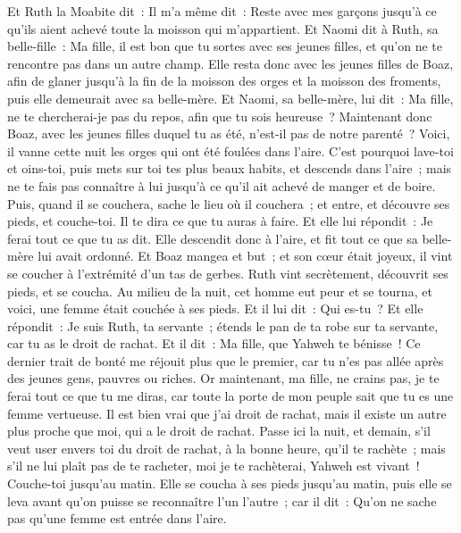\begin{multicols}{2}
Et Ruth la Moabite dit~: Il m'a même dit~: Reste avec mes garçons jusqu'à ce qu'ils aient achevé toute la moisson qui m'appartient.
Et Naomi dit à Ruth, sa belle-fille~: Ma fille, il est bon que tu sortes avec ses jeunes filles, et qu'on ne te rencontre pas dans un autre champ.
Elle resta donc avec les jeunes filles de Boaz, afin de glaner jusqu'à la fin de la moisson des orges et la moisson des froments, puis elle demeurait avec sa belle-mère.
\VerseOne{}Et Naomi, sa belle-mère, lui dit~: Ma fille, ne te chercherai-je pas du repos, afin que tu sois heureuse~?
Maintenant donc Boaz, avec les jeunes filles duquel tu as été, n'est-il pas de notre parenté~? Voici, il vanne cette nuit les orges qui ont été foulées dans l'aire.
C'est pourquoi lave-toi et oins-toi, puis mets sur toi tes plus beaux habits, et descends dans l'aire~; mais ne te fais pas connaître à lui jusqu'à ce qu'il ait achevé de manger et de boire.
Puis, quand il se couchera, sache le lieu où il couchera~; et entre, et découvre ses pieds, et couche-toi. Il te dira ce que tu auras à faire.
Et elle lui répondit~: Je ferai tout ce que tu as dit.
Elle descendit donc à l'aire, et fit tout ce que sa belle-mère lui avait ordonné.
Et Boaz mangea et but~; et son cœur était joyeux, il vint se coucher à l'extrémité d'un tas de gerbes. Ruth vint secrètement, découvrit ses pieds, et se coucha.
Au milieu de la nuit, cet homme eut peur et se tourna, et voici, une femme était couchée à ses pieds.
Et il lui dit~: Qui es-tu~? Et elle répondit~: Je suis Ruth, ta servante~; étends le pan de ta robe sur ta servante, car tu as le droit de rachat.
Et il dit~: Ma fille, que Yahweh te bénisse~! Ce dernier trait de bonté me réjouit plus que le premier, car tu n'es pas allée après des jeunes gens, pauvres ou riches.
Or maintenant, ma fille, ne crains pas, je te ferai tout ce que tu me diras, car toute la porte de mon peuple sait que tu es une femme vertueuse.
Il est bien vrai que j'ai droit de rachat, mais il existe un autre plus proche que moi, qui a le droit de rachat.
Passe ici la nuit, et demain, s'il veut user envers toi du droit de rachat, à la bonne heure, qu'il te rachète~; mais s'il ne lui plaît pas de te racheter, moi je te rachèterai, Yahweh est vivant~! Couche-toi jusqu'au matin.
Elle se coucha à ses pieds jusqu'au matin, puis elle se leva avant qu'on puisse se reconnaître l'un l'autre~; car il dit~: Qu'on ne sache pas qu'une femme est entrée dans l'aire.

\end{multicols}
